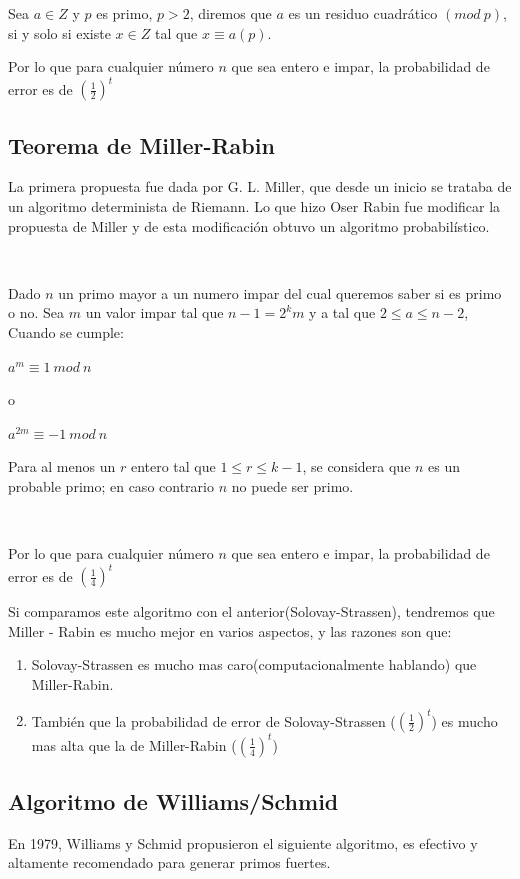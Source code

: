 \documentclass[11pt, conference]{IEEEtran}
\begin{document}
Sea $a\in Z$ y $p$ es primo, $p>2$, diremos que $a$ es un residuo cuadrático $(mod\ p)$, si y solo si existe $x\in Z$ tal que $x\equiv a(p)$.


Por lo que para cualquier número $n$ que sea entero e impar, la probabilidad de error es de  $(\frac{1}{2})^{t}$   
\subsection{Teorema de Miller-Rabin}
La primera propuesta fue dada por G. L. Miller, que desde un inicio se trataba de un algoritmo determinista de Riemann. Lo que hizo Oser Rabin fue modificar la propuesta de Miller y de esta modificación obtuvo un algoritmo probabilístico.\cite{f}

\

Dado $n$ un primo mayor a un numero impar del cual queremos saber si es primo o no. Sea $m$ un valor impar tal que $n-1 = 2^{k} m$ y a tal que $2\leq a\leq n - 2$, Cuando se cumple:
\begin{center}
	$a^{m}\equiv 1\ mod\ n$
	
	o
	
	$a^{2m}\equiv-1\ mod\ n$
\end{center}

Para al menos un $r$ entero tal que $1\leq r\leq k-1$, se considera que $n$ es un probable primo; en caso contrario $n$ no puede ser primo.

\

Por lo que para cualquier número $n$ que sea entero e impar, la probabilidad de error es de  $(\frac{1}{4})^{t}$  

Si comparamos este algoritmo con el anterior(Solovay-Strassen), tendremos que Miller - Rabin es mucho mejor en varios aspectos, y las razones son que:
\begin{enumerate}
	\item Solovay-Strassen es mucho mas caro(computacionalmente hablando) que Miller-Rabin. 
	\item También que la probabilidad de error de Solovay-Strassen ($(\frac{1}{2})^{t}$) es mucho mas alta que la de Miller-Rabin ($(\frac{1}{4})^{t}$)
\end{enumerate}

\subsection{Algoritmo de Williams/Schmid}
En 1979, Williams y Schmid propusieron el siguiente algoritmo, es efectivo y altamente recomendado para generar primos fuertes.
\end{document}
